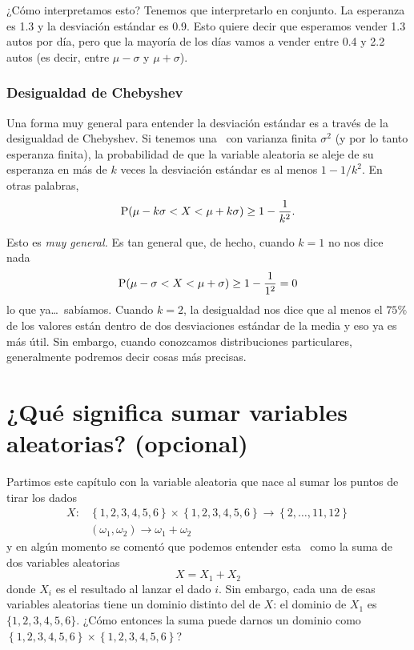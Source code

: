 ¿Cómo interpretamos esto? Tenemos que interpretarlo en conjunto. La esperanza es \num{1,3} y la desviación estándar es \num{0,9}. Esto quiere decir que esperamos vender \num{1,3} autos por día, pero que la mayoría de los días vamos a vender entre \num{0,4} y \num{2,2} autos (es decir, entre \(\mu - \sigma\) y \(\mu + \sigma\)).

\subsubsection{Desigualdad de Chebyshev}

Una forma muy general para entender la desviación estándar es a través de la desigualdad de Chebyshev. Si tenemos una \va\ con varianza finita \(\sigma^2\) (y por lo tanto esperanza finita), la probabilidad de que la variable aleatoria se aleje de su esperanza en más de \(k\) veces la desviación estándar es al menos \(1-1/k^2\). En otras palabras, \[\operatorname{P}(\mu-k\sigma< X < \mu+k\sigma) \geq 1-\frac{1}{k^2}.\]

Esto es \emph{muy general.} Es tan general que, de hecho, cuando \(k=1\) no nos dice nada \[\operatorname{P}(\mu-\sigma< X < \mu+\sigma) \geq 1-\frac{1}{1^2} = 0\] lo que ya\ldots\ sabíamos. Cuando \(k=2\), la desigualdad nos dice que al menos el \(75\%\) de los valores están dentro de dos desviaciones estándar de la media y eso ya es más útil. Sin embargo, cuando conozcamos distribuciones particulares, generalmente podremos decir cosas más precisas.

\section{¿Qué significa sumar variables aleatorias? (opcional)}

Partimos este capítulo con la variable aleatoria que nace al sumar los puntos de tirar los dados
\begin{align*}
    X: & \left\{ 1, 2, 3, 4, 5, 6 \right\} \times \left\{1,  2, 3, 4, 5, 6 \right\} \rightarrow \left\{ 2, \ldots, 11, 12 \right\}\\
    & (\omega_1, \omega_2) \to \omega_1 + \omega_2
\end{align*}
y en algún momento se comentó que podemos entender esta \va\ como la suma de dos variables aleatorias \[X=X_1+X_2\] donde \(X_i\) es el resultado al lanzar el dado \(i\). Sin embargo, cada una de esas variables aleatorias tiene un dominio distinto del de \(X\): el dominio de \(X_1\) es \(\{1, 2, 3, 4, 5, 6\}\). ¿Cómo entonces la suma puede darnos un dominio como \(\left\{ 1, 2, 3, 4, 5, 6 \right\} \times \left\{1,  2, 3, 4, 5, 6 \right\}\)?

